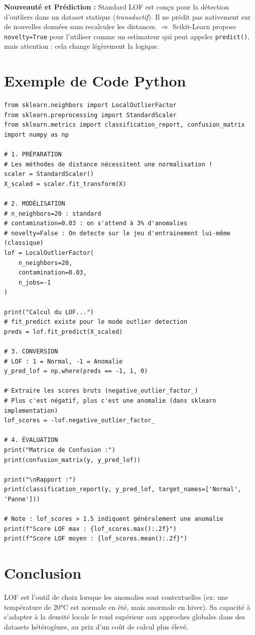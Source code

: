 \documentclass[a4paper,11pt]{article}
\begin{document}
\begin{warningbox}
\textbf{Nouveauté et Prédiction :}
Standard LOF est conçu pour la détection d'outliers dans un dataset statique (\textit{transductif}). Il ne prédit pas nativement sur de nouvelles données sans recalculer les distances.
$\Rightarrow$ Scikit-Learn propose \texttt{novelty=True} pour l'utiliser comme un estimateur qui peut appeler \texttt{predict()}, mais attention : cela change légèrement la logique.
\end{warningbox}

\section{Exemple de Code Python}

\begin{codebox}
\begin{lstlisting}
from sklearn.neighbors import LocalOutlierFactor
from sklearn.preprocessing import StandardScaler
from sklearn.metrics import classification_report, confusion_matrix
import numpy as np

# 1. PRÉPARATION
# Les méthodes de distance nécessitent une normalisation !
scaler = StandardScaler()
X_scaled = scaler.fit_transform(X)

# 2. MODÉLISATION
# n_neighbors=20 : standard
# contamination=0.03 : on s'attend à 3% d'anomalies
# novelty=False : On detecte sur le jeu d'entrainement lui-même (classique)
lof = LocalOutlierFactor(
    n_neighbors=20, 
    contamination=0.03,
    n_jobs=-1
)

print("Calcul du LOF...")
# fit_predict existe pour le mode outlier detection
preds = lof.fit_predict(X_scaled) 

# 3. CONVERSION
# LOF : 1 = Normal, -1 = Anomalie
y_pred_lof = np.where(preds == -1, 1, 0)

# Extraire les scores bruts (negative_outlier_factor_)
# Plus c'est négatif, plus c'est une anomalie (dans sklearn implementation)
lof_scores = -lof.negative_outlier_factor_ 

# 4. ÉVALUATION
print("Matrice de Confusion :")
print(confusion_matrix(y, y_pred_lof))

print("\nRapport :")
print(classification_report(y, y_pred_lof, target_names=['Normal', 'Panne']))

# Note : lof_scores > 1.5 indiquent généralement une anomalie
print(f"Score LOF max : {lof_scores.max():.2f}")
print(f"Score LOF moyen : {lof_scores.mean():.2f}")
\end{lstlisting}
\end{codebox}

\section{Conclusion}

LOF est l'outil de choix lorsque les anomalies sont contextuelles (ex: une température de 20°C est normale en été, mais anormale en hiver). Sa capacité à s'adapter à la densité locale le rend supérieur aux approches globales dans des datasets hétérogènes, au prix d'un coût de calcul plus élevé.
\end{document}
